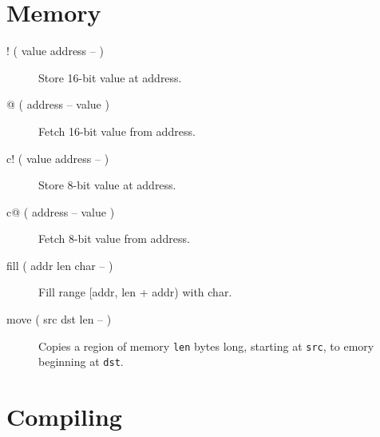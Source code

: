 \section{Memory}

\begin{description}
\item[! ( value address -- )] Store 16-bit value at address.
\item[@ ( address -- value )] Fetch 16-bit value from address.
\item[c! ( value address -- )] Store 8-bit value at address.
\item[c@ ( address -- value )] Fetch 8-bit value from address.
\item[fill ( addr len char -- )] Fill range [addr, len + addr) with char.
\item[move ( src dst len -- )]
Copies a region of memory \texttt{len} bytes long, starting at \texttt{src}, to emory beginning at \texttt{dst}.

\end{description}
\section{Compiling}

